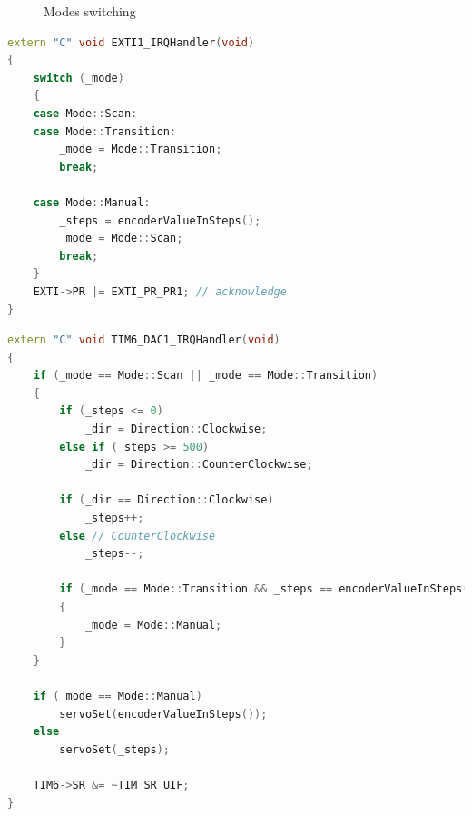 \documentclass{article}
\begin{document}
\begin{figure}[H]
    \caption{Modes switching}
\end{figure}

\begin{lstlisting}[language=C++, caption={Mode Switching handler}]
extern "C" void EXTI1_IRQHandler(void)
{
    switch (_mode)
    {
    case Mode::Scan:
    case Mode::Transition:
        _mode = Mode::Transition;
        break;

    case Mode::Manual:
        _steps = encoderValueInSteps();
        _mode = Mode::Scan;
        break;
    }
    EXTI->PR |= EXTI_PR_PR1; // acknowledge
}

\end{lstlisting}

\begin{lstlisting}[language=C++, caption={Updated Rotation TIM6 handler}]
extern "C" void TIM6_DAC1_IRQHandler(void)
{
    if (_mode == Mode::Scan || _mode == Mode::Transition)
    {
        if (_steps <= 0)
            _dir = Direction::Clockwise;
        else if (_steps >= 500)
            _dir = Direction::CounterClockwise;

        if (_dir == Direction::Clockwise)
            _steps++;
        else // CounterClockwise
            _steps--;

        if (_mode == Mode::Transition && _steps == encoderValueInSteps())
        {
            _mode = Mode::Manual;
        }
    }

    if (_mode == Mode::Manual)
        servoSet(encoderValueInSteps());
    else
        servoSet(_steps);

    TIM6->SR &= ~TIM_SR_UIF;
}
\end{lstlisting}
\end{document}
